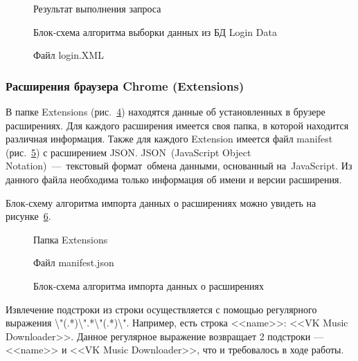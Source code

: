 \begin{figure}[h!]
\caption{Результат выполнения запроса}
\label{ship_2:ship_2}
\end{figure}

\begin{figure}[h!]
\caption{Блок-схема алгоритма выборки данных из БД Login Data}
\label{ship_3:ship_3}
\end{figure} 


\begin{figure}[h!]
\caption{Файл login.XML}
\label{ship_4:ship_4}
\end{figure} 

\clearpage
\subsubsection{Расширения браузера Chrome (Extensions)}

В папке Extensions (рис.~\ref{ship_5:ship_5}) находятся данные об установленных в брузере расширениях. Для каждого расширения имеется своя папка, в которой находится различная информация. Также для каждого Extension имеется файл manifest (рис.~\ref{ship_6:ship_6}) с расширением JSON. JSON (JavaScript Object Notation) --- текстовый формат обмена данными, основанный на JavaScript. Из данного файла необходима только информация об имени и версии расширения.


Блок-схему алгоритма импорта данных о расширениях можно увидеть на рисунке~\ref{ship_7:ship_7}. 


\begin{figure}[h!]
\caption{Папка Extensions}
\label{ship_5:ship_5}
\end{figure}

\begin{figure}[h!]
\caption{Файл manifest.json}
\label{ship_6:ship_6}
\end{figure}

\begin{figure}[h!]
\caption{Блок-схема алгоритма импорта данных о расширениях}
\label{ship_7:ship_7}
\end{figure}

\clearpage
Извлечение подстроки из строки осуществляется с помощью регулярного выражения \textbackslash"(.*)\textbackslash".*\textbackslash"(.*)\textbackslash". Например, есть строка <<name>>: <<VK Music Downloader>>. Данное регулярное выражение возвращает 2 подстроки --- <<name>> и <<VK Music Downloader>>, что и требовалось в ходе работы.


